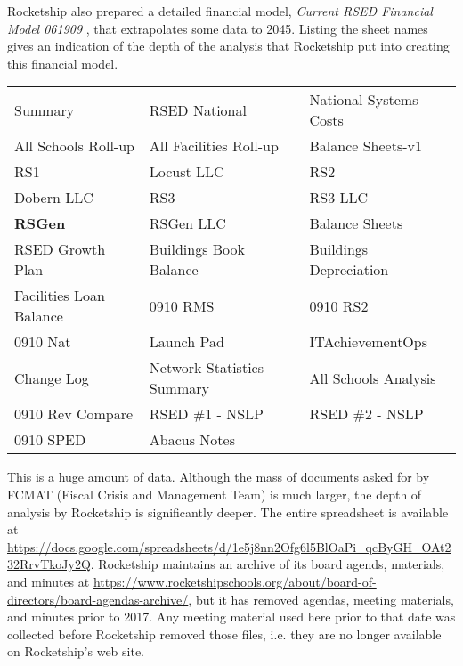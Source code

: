 Rocketship also prepared a detailed financial model, \textit{Current RSED Financial Model 061909} \parencite{RSED2009a}, that extrapolates some data to 2045. Listing the sheet names gives an indication of the depth of the analysis that Rocketship put into creating this financial model. 
\begin{table}[ht]
    \begin{tabular}{lll}
      Summary & RSED National & National Systems Costs \\
      All Schools Roll-up & All Facilities Roll-up & Balance Sheets-v1\\
      RS1 & Locust LLC & RS2 \\
      Dobern LLC & RS3 & RS3 LLC \\
      \textbf{RSGen} & RSGen LLC & Balance Sheets \\
      RSED Growth Plan & Buildings Book Balance & Buildings Depreciation \\
      Facilities Loan Balance & 0910 RMS & 0910 RS2 \\
      0910 Nat & Launch Pad & ITAchievementOps \\
      Change Log & Network Statistics Summary & All Schools Analysis\\
      0910 Rev Compare & RSED \#1  - NSLP & RSED \#2 - NSLP\\
      0910 SPED &  Abacus Notes \\
  \end{tabular}
\end{table}

This is a huge amount of data. Although the mass of documents asked for by FCMAT (Fiscal Crisis and Management Team) is much larger, the depth of analysis by Rocketship is significantly deeper. The entire spreadsheet is available at \url{https://docs.google.com/spreadsheets/d/1e5j8nn2Ofg6l5BlOaPi_qcByGH_OAt232RrvTkoJy2Q}. Rocketship maintains an archive of its board agends, materials, and minutes at \url{https://www.rocketshipschools.org/about/board-of-directors/board-agendas-archive/}, but it has removed agendas, meeting materials, and minutes prior to 2017. Any meeting material used here prior to that date was collected before Rocketship removed those files, i.e. they are no longer available on Rocketship's web site.

